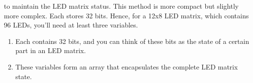 \documentclass[a4paper,11pt,english]{sphinxmanual}
\begin{document}
\begin{sphinxVerbatim}[commandchars=\\\{\}]
\end{sphinxVerbatim}

\sphinxAtStartPar
{} to maintain the LED matrix status. This method is more compact but slightly more complex. Each  stores 32 bits. Hence, for a 12x8 LED matrix, which contains 96 LEDs, you’ll need at least three  variables.
\begin{enumerate}
%
\item {} 
\sphinxAtStartPar
Each  contains 32 bits, and you can think of these bits as the state of a certain part in an LED matrix.

\item {} 
\sphinxAtStartPar
These  variables form an array that encapsulates the complete LED matrix state.

\end{enumerate}
\end{document}
